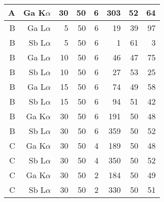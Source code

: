 \begin{table}[phtb]
\begin{center}
\begin{tabular}{rrrrrrrr}
            A               & Ga K$\alpha$       & 30             & 50             & 6           & 303               & 52                   & 64                        \\
            \hline
            B               & Ga L$\alpha$       & 5              & 50             & 6           & 19                & 39                   & 97                        \\
            B               & Sb L$\alpha$       & 5              & 50             & 6           & 1                 & 61                   & 3                         \\
            B               & Ga L$\alpha$       & 10             & 50             & 6           & 46                & 47                   & 75                        \\
            B               & Sb L$\alpha$       & 10             & 50             & 6           & 27                & 53                   & 25                        \\
            B               & Ga L$\alpha$       & 15             & 50             & 6           & 74                & 49                   & 58                        \\
            B               & Sb L$\alpha$       & 15             & 50             & 6           & 94                & 51                   & 42                        \\
            B               & Ga K$\alpha$       & 30             & 50             & 6           & 191               & 50                   & 48                        \\
            B               & Sb L$\alpha$       & 30             & 50             & 6           & 359               & 50                   & 52                        \\
            \hline
            C               & Ga K$\alpha$       & 30             & 50             & 4           & 189               & 50                   & 48                        \\
            C               & Sb L$\alpha$       & 30             & 50             & 4           & 350               & 50                   & 52                        \\
            C               & Ga K$\alpha$       & 30             & 50             & 2           & 184               & 50                   & 49                        \\
            C               & Sb L$\alpha$       & 30             & 50             & 2           & 330               & 50                   & 51                        \\

\end{tabular}
\end{center}
\end{table}
